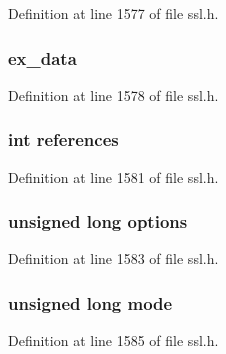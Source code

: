 Definition at line 1577 of file ssl.\+h.

\subsubsection[{\texorpdfstring{ex\+\_\+data}{ex_data}}]{ ex\+\_\+data}\hypertarget{structssl__st_ac3e4fd59d6ee44a81f3a58114613c1e2}{}\label{structssl__st_ac3e4fd59d6ee44a81f3a58114613c1e2}


Definition at line 1578 of file ssl.\+h.

\subsubsection[{\texorpdfstring{references}{references}}]{\setlength{\rightskip}{0pt plus 5cm}int references}\hypertarget{structssl__st_a146fdb34d9a909e530adf8b189481195}{}\label{structssl__st_a146fdb34d9a909e530adf8b189481195}


Definition at line 1581 of file ssl.\+h.

\subsubsection[{\texorpdfstring{options}{options}}]{\setlength{\rightskip}{0pt plus 5cm}unsigned long options}\hypertarget{structssl__st_aa6e0a0e8b728c3cc137ba2dfac41f277}{}\label{structssl__st_aa6e0a0e8b728c3cc137ba2dfac41f277}


Definition at line 1583 of file ssl.\+h.

\subsubsection[{\texorpdfstring{mode}{mode}}]{\setlength{\rightskip}{0pt plus 5cm}unsigned long mode}\hypertarget{structssl__st_ae78fbaec9753aee588d055aef59a801c}{}\label{structssl__st_ae78fbaec9753aee588d055aef59a801c}


Definition at line 1585 of file ssl.\+h.

